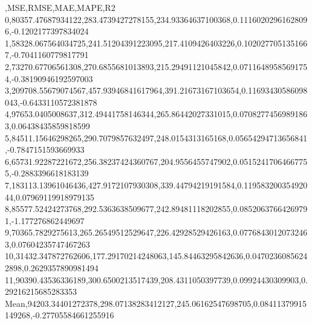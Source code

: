 ,MSE,RMSE,MAE,MAPE,R2
0,80357.47687934122,283.4739427278155,234.93364637100368,0.11160202961628096,-0.1202177397834024
1,58328.067564034725,241.51204391223095,217.4109426403226,0.1020277051351667,-0.7041160779817791
2,73270.67706561308,270.6855681013893,215.29491121045842,0.07116489585691754,-0.38190946192597003
3,209708.55679074567,457.93946841617964,391.21673167103654,0.11693430586098043,-0.6433110572381878
4,97653.0405008637,312.49441758146344,265.86442027331015,0.07082774569891863,0.06438435859818599
5,84511.15646298265,290.7079857632497,248.0154313165168,0.05654294713656841,-0.7847151593669933
6,65731.92287221672,256.38237424360767,204.9556455747902,0.05152417064667755,-0.2883396618183139
7,183113.13961046436,427.9172107930308,339.44794219191584,0.11958320035492044,0.07969119918979135
8,85577.52424273768,292.5363638509677,242.89481118202855,0.08520637664269791,-1.177276862449697
9,70365.7829275613,265.26549512529647,226.42928529426163,0.07768430120732463,0.07604235747467263
10,31432.347872762606,177.29170214248063,145.84463295842636,0.04702360856242898,0.2629357890981494
11,90390.43536336189,300.6500213517439,208.4311050397739,0.09924430309903,0.29216215685283353
Mean,94203.34401272378,298.07138283412127,245.06162547698705,0.08411379915149268,-0.27705584661255916
